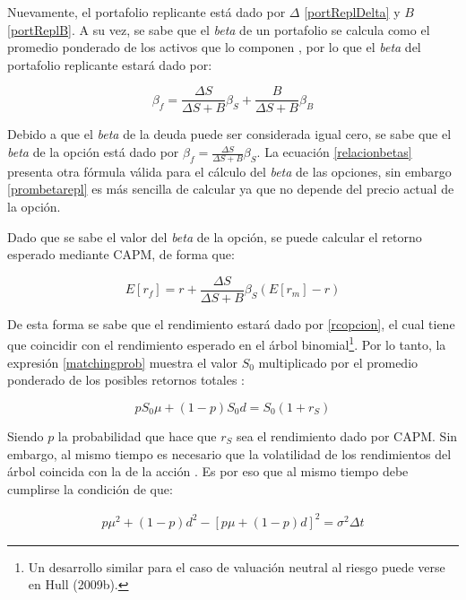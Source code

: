 Nuevamente, el portafolio replicante está dado por $\Delta$ \eqref{portReplDelta} y $B$ \eqref{portReplB}. A su vez, se sabe que el \textit{beta} de un portafolio se calcula como el promedio ponderado de los activos que lo componen \cite[p.135]{hull}, por lo que el \textit{beta} del portafolio replicante estará dado por:

\begin{equation}
	\beta_f = \frac{\Delta S}{\Delta S + B} \beta_S + \frac{B}{\Delta S + B} \beta_B \label{prombetarepl}
\end{equation}

Debido a que el \textit{beta} de la deuda puede ser considerada igual cero, se sabe que el \textit{beta} de la opción está dado por $ \beta_f = \frac{\Delta S}{\Delta S + B} \beta_S $. La ecuación \eqref{relacionbetas} presenta otra fórmula válida para el cálculo del \textit{beta} de las opciones, sin embargo \eqref{prombetarepl} es más sencilla de calcular ya que no depende del precio actual de la opción.

Dado que se sabe el valor del \textit{beta} de la opción, se puede calcular el retorno esperado mediante CAPM, de forma que:

\begin{equation}
	E[r_f] = r + \frac{\Delta S}{\Delta S + B} \beta_S (E[r_m] - r) \label{rcopcion}
\end{equation}

De esta forma se sabe que el rendimiento estará dado por \eqref{rcopcion}, el cual tiene que coincidir con el rendimiento esperado en el árbol binomial\footnote{Un desarrollo similar para el caso de valuación neutral al riesgo puede verse en Hull (2009b).\nocite{hulleng}}.
Por lo tanto, la expresión \eqref{matchingprob} muestra el valor $S_0$ multiplicado por el promedio ponderado de los posibles retornos totales \cite{appliedderiv}:

\begin{equation}
	p S_0 \mu + (1-p) S_0 d = S_0 (1 + r_S) \label{matchingprob}
\end{equation}

Siendo $p$ la probabilidad que hace que $r_S$ sea el rendimiento dado por CAPM. Sin embargo, al mismo tiempo es necesario que la volatilidad de los rendimientos del árbol coincida con la de la acción \cite{hulleng}. Es por eso que al mismo tiempo debe cumplirse la condición de que:

\begin{align}
	p \mu^2 + (1-p) d^2 - [p \mu  + (1-p) d]^2 = \sigma^2 \Delta t \label{matchvolat}
\end{align}

